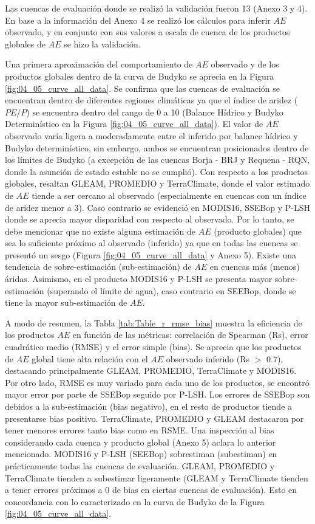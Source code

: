 \documentclass[12pt]{article}
\begin{document}
\clearpage

\clearpage

\clearpage
Las cuencas de evaluación donde se realizó la validación fueron 13 (Anexo 3 y 4). En base a la información del Anexo 4 se realizó los cálculos para inferir $AE$ observado, y en conjunto con sus valores a escala de cuenca de los productos globales de $AE$ se hizo la validación. 

Una primera aproximación del comportamiento de $AE$ observado y de los productos globales dentro de la curva de Budyko se aprecia en la Figura \ref{fig:04_05_curve_all_data}. Se confirma que las cuencas de evaluación se encuentran dentro de diferentes regiones climáticas ya que el índice de aridez ($PE/P$) se encuentra dentro del rango de 0 a 10 (Balance Hídrico y Budyko Determinístico en la Figura \ref{fig:04_05_curve_all_data}). El valor de $AE$ observado varía ligera a moderadamente entre el inferido por balance hídrico y Budyko determinístico, sin embargo, ambos se encuentran posicionados dentro de los límites de Budyko (a excepción de las cuencas Borja - BRJ y Requena - RQN, donde la asunción de estado estable no se cumplió). Con respecto a los productos globales, resaltan GLEAM, PROMEDIO y TerraClimate, donde el valor estimado de $AE$ tiende a ser cercano al observado (especialmente en cuencas con un índice de aridez menor a 3). Caso contrario se evidenció en MODIS16, SSEBop y P-LSH donde se aprecia mayor disparidad con respecto al observado. Por lo tanto, se debe mencionar que no existe alguna estimación de $AE$ (producto globales) que sea lo suficiente próximo al observado (inferido) ya que en todas las cuencas se presentó un sesgo (Figura \ref{fig:04_05_curve_all_data} y Anexo 5). Existe una tendencia de sobre-estimación (sub-estimación) de $AE$ en cuencas más (menos) áridas. Asimismo, en el producto MODIS16 y P-LSH se presenta mayor sobre-estimación (superando el límite de agua), caso contrario en SEEBop, donde se tiene la mayor sub-estimación de $AE$.

A modo de resumen, la Tabla \ref{tab:Table_r_rmse_bias} muestra la eficiencia de los productos $AE$ en función de las métricas: correlación de Spearman (Rs), error cuadrático medio (RMSE) y el error simple (bias). Se aprecia que los productos de $AE$ global tiene alta relación con el $AE$ observado inferido (Rs $>$ 0.7), destacando principalmente GLEAM, PROMEDIO, TerraClimate y MODIS16. Por otro lado, RMSE es muy variado para cada uno de los productos, se encontró mayor error por parte de SSEBop seguido por P-LSH. Los errores de SSEBop son debidos a la sub-estimación (bias negativo), en el resto de productos tiende a presentarse bias positivo. TerraClimate, PROMEDIO y GLEAM destacaron por tener menores errores tanto bias como en RSME. Una inspección al bias considerando cada cuenca y producto global (Anexo 5) aclara lo anterior mencionado. MODIS16 y P-LSH (SEEBop) sobrestiman (subestiman) en prácticamente todas las cuencas de evaluación. GLEAM, PROMEDIO y TerraClimate tienden a subestimar ligeramente (GLEAM y TerraClimate tienden a tener errores próximos a 0 de bias en ciertas cuencas de evaluación). Esto en concordancia con lo caracterizado en la curva de Budyko de la Figura \ref{fig:04_05_curve_all_data}.
\end{document}
